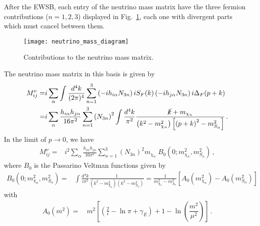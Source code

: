 After the EWSB, each entry of the neutrino mass matrix have the three fermion contributions ($n=1,2,3$) displayed in Fig.~\ref{fig:T13Aweylme}, each one with divergent parts which must cancel between them.  
\begin{figure}
  \centering
  \texttt{[image: neutrino\_mass\_diagram]}
  \caption{Contributions to the neutrino mass matrix.}
  \label{fig:T13Aweylme}
\end{figure}
%
The neutrino mass matrix in this basis is given by
\begin{align*}
  M^{\nu}_{ij}=&i\sum_{\alpha}\int \frac{d^4k}{(2\pi)^4}\sum_{n=1}^3 \left( -i h_{i\alpha} N_{3n} \right) i S_F(k)\left( -i h_{j\alpha} N_{3n} \right)i\Delta_F(p+k)\nonumber\\
=&i\sum_{\alpha}\frac{h_{i\alpha}h_{j\alpha}}{16\pi^2}\sum_{n=1}^3 \left( N_{3n} \right)^2\int \frac{d^4k}{\pi^2}\frac{\cancel{k}+m_{\chi_n}}{\left(k^2-m_{\chi_n}^2  \right)\left[\left(p+k\right)^2-m_{S_\alpha}^2\right]}\,.
\end{align*}
In the limit of $p\to 0$, we have
\begin{align}
\label{eq:mnueig}
  M^{\nu}_{ij}=&i^2\sum_{\alpha}\frac{h_{i\alpha}h_{j\alpha}}{16\pi^2}\sum_{n=1}^3 \left( N_{3n} \right)^2m_{\chi_n}\; B_0 \left(0;m_{\chi_n}^2,m^2_{S_{\alpha}} \right)\,,
\end{align}
where $B_0$ is the Passarino Veltman functions given by~\cite{Passarino:1978jh}
%
\begin{align}
B_0 \left(0;m_{\chi_n}^2,m^2_{S_{\alpha}} \right)=&\int \frac{d^4k}{i\pi^2}\frac{1}{\left(k^2-m_{\chi_n}^2\right)\left(k^2-m_{S_\alpha}^2\right)}
=\frac{1}{m_{\chi_n}^2-m_{S_\alpha}^2}\left[ A_0\left(m_{\chi_n}^2\right)-A_0\left(m_{S_\alpha}^2\right)  \right] 
\end{align}
%
with
\begin{align}
A_0\left(m^2\right)=&\, m^2 \left[ \left( \frac{2}{\epsilon}-\ln\pi+\gamma_E \right)+1-\ln \left(\dfrac{m^2}{\mu^2} \right) \right] \,.
\end{align}

